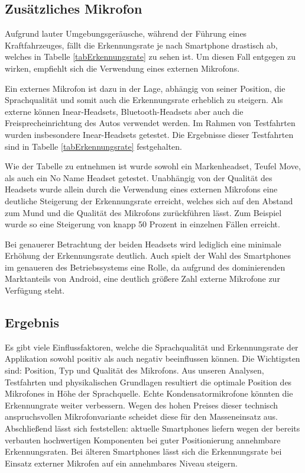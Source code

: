 \subsection{Zusätzliches Mikrofon}
\label{sctAddMic}
Aufgrund lauter Umgebungsgeräusche, während der Führung eines Kraftfahrzeuges, fällt die Erkennungsrate je nach Smartphone drastisch ab, welches in Tabelle \ref{tabErkennungsrate} zu sehen ist. Um diesen Fall entgegen zu wirken, empfiehlt sich die Verwendung eines externen Mikrofons. 

Ein externes Mikrofon ist dazu in der Lage, abhängig von seiner Position, die Sprachqualität und somit auch die Erkennungsrate erheblich zu steigern. Als externe können Inear-Headsets, Bluetooth-Headsets aber auch die Freisprecheinrichtung des Autos verwendet werden. Im Rahmen von Testfahrten wurden insbesondere Inear-Headsets getestet. Die Ergebnisse dieser Testfahrten sind in Tabelle \ref{tabErkennungsrate} festgehalten.

Wie der Tabelle zu entnehmen ist wurde sowohl ein Markenheadset, Teufel Move, als auch ein No Name Headset getestet. Unabhängig von der Qualität des Headsets wurde allein durch die Verwendung eines externen Mikrofons eine deutliche Steigerung der Erkennungsrate erreicht, welches sich auf den Abstand zum Mund und die Qualität des Mikrofons zurückführen lässt. Zum Beispiel wurde so eine Steigerung von knapp 50 Prozent in einzelnen Fällen erreicht.

Bei genauerer Betrachtung der beiden Headsets wird lediglich eine minimale Erhöhung der Erkennungsrate deutlich. Auch spielt der Wahl des Smartphones im genaueren des Betriebssystems eine Rolle, da aufgrund des dominierenden Marktanteils von Android, eine deutlich größere Zahl externe Mikrofone zur Verfügung steht.

\subsection{Ergebnis}
Es gibt viele Einflussfaktoren, welche die Sprachqualität und Erkennungsrate der Applikation sowohl positiv als auch negativ beeinflussen können. Die Wichtigsten sind: Position, Typ und Qualität des Mikrofons. Aus unseren Analysen, Testfahrten und physikalischen Grundlagen resultiert die optimale Position des Mikrofones in Höhe der Sprachquelle. Echte Kondensatormikrofone könnten die Erkennungrate weiter verbessern. Wegen des hohen Preises dieser technisch anspruchsvollen Mikrofonvariante scheidet diese für den Masseneinsatz aus.
Abschließend lässt sich feststellen: aktuelle Smartphones liefern wegen der bereits verbauten hochwertigen Komponenten bei guter Positionierung annehmbare Erkennungsraten.  
Bei älteren Smartphones lässt sich die Erkennungsrate bei Einsatz externer Mikrofen auf ein annehmbares Niveau steigern.


